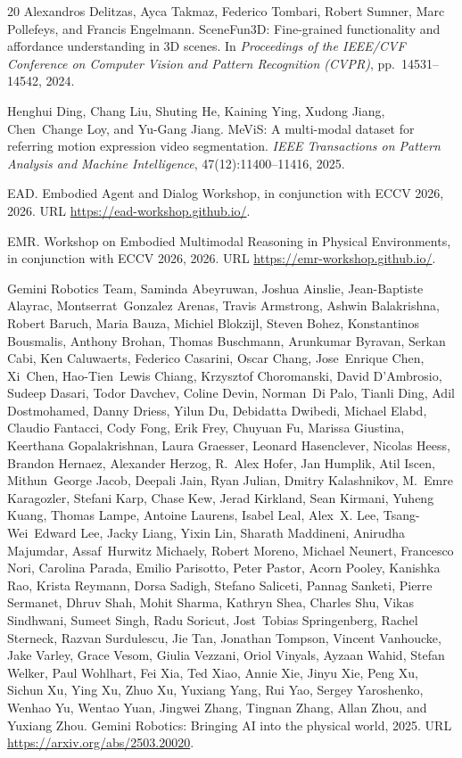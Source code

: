 \documentclass{article}
\begin{document}
\begin{thebibliography}{20}
Alexandros Delitzas, Ayca Takmaz, Federico Tombari, Robert Sumner, Marc Pollefeys, and Francis Engelmann.
\newblock SceneFun3D: Fine-grained functionality and affordance understanding in 3D scenes.
\newblock In \emph{Proceedings of the IEEE/CVF Conference on Computer Vision and Pattern Recognition (CVPR)}, pp.\ 14531--14542, 2024.

Henghui Ding, Chang Liu, Shuting He, Kaining Ying, Xudong Jiang, Chen~Change Loy, and Yu-Gang Jiang.
\newblock MeViS: A multi-modal dataset for referring motion expression video segmentation.
\newblock \emph{IEEE Transactions on Pattern Analysis and Machine Intelligence}, 47(12):11400--11416, 2025.

EAD.
\newblock Embodied Agent and Dialog Workshop, in conjunction with ECCV 2026, 2026.
\newblock URL \url{https://ead-workshop.github.io/}.

EMR.
\newblock Workshop on Embodied Multimodal Reasoning in Physical Environments, in conjunction with ECCV 2026, 2026.
\newblock URL \url{https://emr-workshop.github.io/}.

Gemini Robotics Team, Saminda Abeyruwan, Joshua Ainslie, Jean-Baptiste Alayrac, Montserrat~Gonzalez Arenas, Travis Armstrong, Ashwin Balakrishna, Robert Baruch, Maria Bauza, Michiel Blokzijl, Steven Bohez, Konstantinos Bousmalis, Anthony Brohan, Thomas Buschmann, Arunkumar Byravan, Serkan Cabi, Ken Caluwaerts, Federico Casarini, Oscar Chang, Jose~Enrique Chen, Xi~Chen, Hao-Tien~Lewis Chiang, Krzysztof Choromanski, David D'Ambrosio, Sudeep Dasari, Todor Davchev, Coline Devin, Norman~Di Palo, Tianli Ding, Adil Dostmohamed, Danny Driess, Yilun Du, Debidatta Dwibedi, Michael Elabd, Claudio Fantacci, Cody Fong, Erik Frey, Chuyuan Fu, Marissa Giustina, Keerthana Gopalakrishnan, Laura Graesser, Leonard Hasenclever, Nicolas Heess, Brandon Hernaez, Alexander Herzog, R.~Alex Hofer, Jan Humplik, Atil Iscen, Mithun~George Jacob, Deepali Jain, Ryan Julian, Dmitry Kalashnikov, M.~Emre Karagozler, Stefani Karp, Chase Kew, Jerad Kirkland, Sean Kirmani, Yuheng Kuang, Thomas Lampe, Antoine Laurens, Isabel Leal, Alex~X. Lee, Tsang-Wei~Edward Lee, Jacky Liang, Yixin Lin, Sharath Maddineni, Anirudha Majumdar, Assaf~Hurwitz Michaely, Robert Moreno, Michael Neunert, Francesco Nori, Carolina Parada, Emilio Parisotto, Peter Pastor, Acorn Pooley, Kanishka Rao, Krista Reymann, Dorsa Sadigh, Stefano Saliceti, Pannag Sanketi, Pierre Sermanet, Dhruv Shah, Mohit Sharma, Kathryn Shea, Charles Shu, Vikas Sindhwani, Sumeet Singh, Radu Soricut, Jost~Tobias Springenberg, Rachel Sterneck, Razvan Surdulescu, Jie Tan, Jonathan Tompson, Vincent Vanhoucke, Jake Varley, Grace Vesom, Giulia Vezzani, Oriol Vinyals, Ayzaan Wahid, Stefan Welker, Paul Wohlhart, Fei Xia, Ted Xiao, Annie Xie, Jinyu Xie, Peng Xu, Sichun Xu, Ying Xu, Zhuo Xu, Yuxiang Yang, Rui Yao, Sergey Yaroshenko, Wenhao Yu, Wentao Yuan, Jingwei Zhang, Tingnan Zhang, Allan Zhou, and Yuxiang Zhou.
\newblock Gemini Robotics: Bringing AI into the physical world, 2025.
\newblock URL \url{https://arxiv.org/abs/2503.20020}.


\end{thebibliography}
\end{document}
